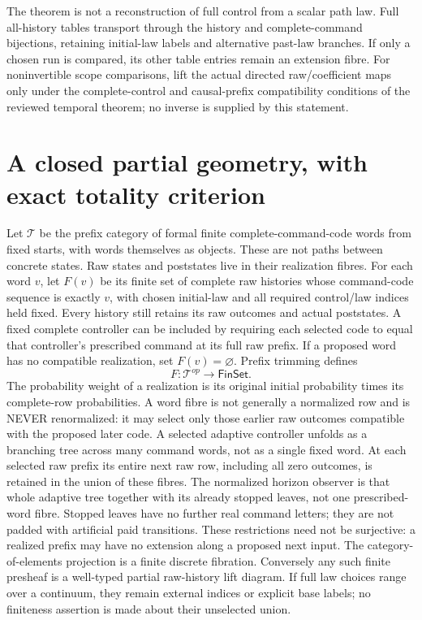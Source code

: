 \documentclass[11pt]{article}
\begin{document}
The theorem is not a reconstruction of full control from a scalar path law. Full all-history tables transport through the history and complete-command bijections, retaining initial-law labels and alternative past-law branches. If only a chosen run is compared, its other table entries remain an extension fibre. For noninvertible scope comparisons, lift the actual directed raw/coefficient maps only under the complete-control and causal-prefix compatibility conditions of the reviewed temporal theorem; no inverse is supplied by this statement.

\section{A closed partial geometry, with exact totality criterion}
Let $\mathcal T$ be the prefix category of formal finite complete-command-code words from fixed starts, with words themselves as objects. These are not paths between concrete states. Raw states and poststates live in their realization fibres. For each word $v$, let $F(v)$ be its finite set of complete raw histories whose command-code sequence is exactly $v$, with chosen initial-law and all required control/law indices held fixed. Every history still retains its raw outcomes and actual poststates. A fixed complete controller can be included by requiring each selected code to equal that controller's prescribed command at its full raw prefix. If a proposed word has no compatible realization, set $F(v)=\varnothing$. Prefix trimming defines
\[
                 F:\mathcal T^{op}\longrightarrow\mathsf{FinSet}.
\]
The probability weight of a realization is its original initial probability times its complete-row probabilities. A word fibre is not generally a normalized row and is NEVER renormalized: it may select only those earlier raw outcomes compatible with the proposed later code. A selected adaptive controller unfolds as a branching tree across many command words, not as a single fixed word. At each selected raw prefix its entire next raw row, including all zero outcomes, is retained in the union of these fibres. The normalized horizon observer is that whole adaptive tree together with its already stopped leaves, not one prescribed-word fibre. Stopped leaves have no further real command letters; they are not padded with artificial paid transitions. These restrictions need not be surjective: a realized prefix may have no extension along a proposed next input. The category-of-elements projection is a finite discrete fibration. Conversely any such finite presheaf is a well-typed partial raw-history lift diagram. If full law choices range over a continuum, they remain external indices or explicit base labels; no finiteness assertion is made about their unselected union.
\end{document}
